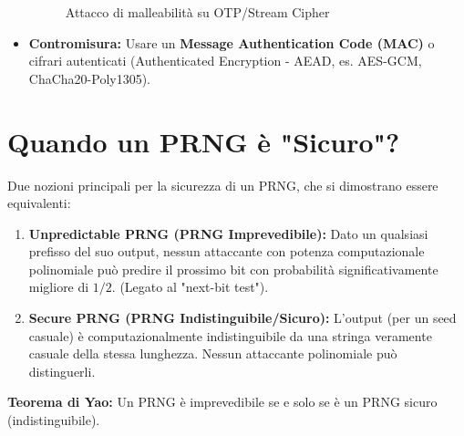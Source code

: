 \begin{itemize}
\begin{figure}[H]
        \caption{Attacco di malleabilità su OTP/Stream Cipher}
    \end{figure}
    \item \textbf{Contromisura:} Usare un \textbf{Message Authentication Code (MAC)} o cifrari autenticati (Authenticated Encryption - AEAD, es. AES-GCM, ChaCha20-Poly1305).
\end{itemize}

\section{Quando un PRNG è "Sicuro"?}
Due nozioni principali per la sicurezza di un PRNG, che si dimostrano essere equivalenti:
\begin{enumerate}
    \item \textbf{Unpredictable PRNG (PRNG Imprevedibile):}
    Dato un qualsiasi prefisso del suo output, nessun attaccante con potenza computazionale polinomiale può predire il prossimo bit con probabilità significativamente migliore di $1/2$. (Legato al "next-bit test").
    \item \textbf{Secure PRNG (PRNG Indistinguibile/Sicuro):}
    L'output (per un seed casuale) è computazionalmente indistinguibile da una stringa veramente casuale della stessa lunghezza. Nessun attaccante polinomiale può distinguerli.
\end{enumerate}
\textbf{Teorema di Yao:} Un PRNG è imprevedibile se e solo se è un PRNG sicuro (indistinguibile).

